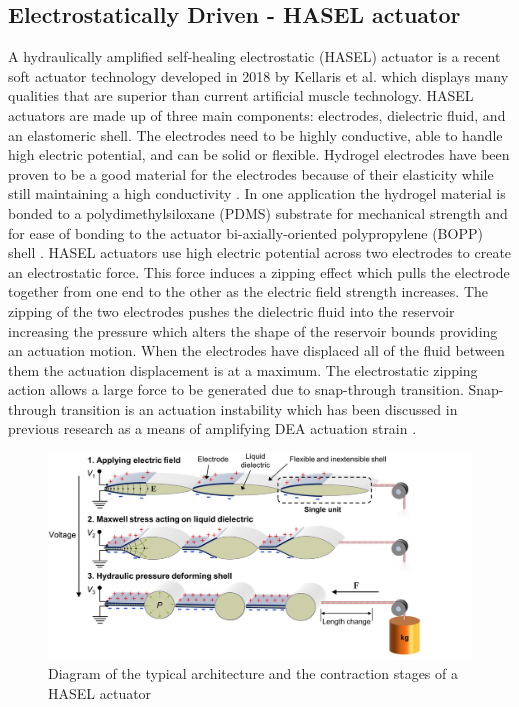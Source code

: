 \subsection{Electrostatically Driven - HASEL actuator}
\label{subsec:hasel-actuator}
A hydraulically amplified self‐healing electrostatic (HASEL) actuator is a recent soft actuator technology developed in 2018 by Kellaris et al.\citep{Kellaris2018} which displays many qualities that are superior than current artificial muscle technology. HASEL actuators are made up of three main components: electrodes, dielectric fluid, and an elastomeric shell. The electrodes need to be highly conductive, able to handle high electric potential, and can be solid or flexible. Hydrogel electrodes have been proven to be a good material for the electrodes because of their elasticity while still maintaining a high conductivity \citep{Acome2018}. In one application the hydrogel material is bonded to a polydimethylsiloxane (PDMS) substrate for mechanical strength and for ease of bonding to the actuator bi-axially-oriented polypropylene (BOPP) shell \citep{Kellaris2018,Yuk2016}. HASEL actuators use high electric potential across two electrodes to create an electrostatic force. This force induces a zipping effect which pulls the electrode together from one end to the other as the electric field strength increases. The zipping of the two electrodes pushes the dielectric fluid into the reservoir increasing the pressure which alters the shape of the reservoir bounds providing an actuation motion. When the electrodes have displaced all of the fluid between them the actuation displacement is at a maximum. The electrostatic zipping action allows a large force to be generated due to snap-through transition. Snap-through transition is an actuation instability which has been discussed in previous research as a means of amplifying DEA actuation strain \citep{Keplinger2012}. 
\begin{figure}[H]
	\centering
	\includegraphics[width=0.7\linewidth]{Figures/HASEL_actuator_crop.jpg}
	\caption{Diagram of the typical architecture and the contraction stages of a HASEL actuator \citep{Kellaris2018}}
	\label{fig:Artificial Muscle_HASEL}
\end{figure}
